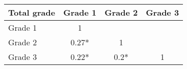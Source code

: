 \begin{tabular}{l|ccc}
\toprule
\multicolumn{1}{l}{Total grade} & \multicolumn{1}{l}{Grade 1} & \multicolumn{1}{l}{Grade 2} & \multicolumn{1}{l}{Grade 3} \\
\midrule
\midrule
Grade 1 & 1     &       &  \\
Grade 2 & 0.27* & 1     &  \\
Grade 3 & 0.22* & 0.2*  & 1 \\
\end{tabular}%
